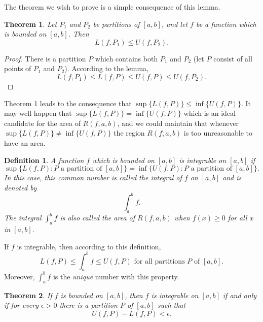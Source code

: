 \documentclass{article}
\newtheorem{definition}{Definition}
\newtheorem{theorem}{Theorem}
\begin{document}
The theorem we wish to prove is a simple consequence of this lemma.

\begin{theorem}
  Let $P_1$ and $P_2$ be partitions of $[a, b]$, and let $f$ be a function
  which is bounded on $[a, b]$. Then \begin{equation*}
    L(f, P_1) \leq U(f, P_2).
  \end{equation*}
\end{theorem}

\begin{proof}
  There is a partition $P$ which contains both $P_1$ and $P_2$ (let $P$ consist
  of all points of $P_1$ and $P_2$). According to the lemma, \begin{equation*}
    L(f, P_1) \leq L(f, P) \leq U(f, P) \leq U(f, P_2).
  \end{equation*}
\end{proof}

Theorem 1 leads to the consequence that $\sup\{L(f, P)\} \leq \inf\{U(f, P)\}$.
It may well happen that $\sup\{L(f, P)\} = \inf\{U(f, P)\}$ which is an ideal
candidate for the area of $R(f, a, b)$, and we could maintain that whenever
$\sup\{L(f, P)\} \neq \inf\{U(f, P)\}$ the region $R(f, a, b)$ is too
unreasonable to have an area.

\begin{definition}
  A function $f$ which is bounded on $[a, b]$ is \emph{integrable} on $[a, b]$
  if \begin{equation*}
    \sup\{L(f, P): P \text{ a partition of } [a, b]\} = \inf\{U(f, P): P
      \text{ a partition of } [a, b]\}.
  \end{equation*} In this case, this common number is called the
  \emph{integral} of $f$ on $[a, b]$ and is denoted by \begin{equation*}
    \int_a^b f.
  \end{equation*} The integral $\int_a^b f$ is also called the \emph{area} of
  $R(f, a, b)$ when $f(x) \geq 0$ for all $x$ in $[a, b]$.
\end{definition}

If $f$ is integrable, then according to this definition, \begin{equation*}
  L(f, P) \leq \int_a^b f \leq U(f, P) \text{ for all partitions } P
    \text{ of } [a, b].
\end{equation*} Moreover, $\int_a^b f$ is the \emph{unique} number with this
property.

\begin{theorem}
  If $f$ is bounded on $[a, b]$, then $f$ is integrable on $[a, b]$ if and only
  if for every $\epsilon > 0$ there is a partition $P$ of $[a, b]$ such that
  \begin{equation*}
    U(f, P) - L(f, P) < \epsilon.
  \end{equation*}
\end{theorem}
\end{document}
